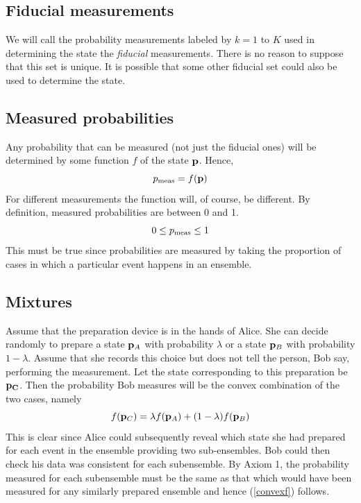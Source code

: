 \documentclass[12pt]{article}
\begin{document}
\subsection{Fiducial measurements}

We will call the probability measurements
labeled by $k=1$ to $K$ used in determining the state the {\it fiducial}
measurements.  There is no reason to suppose that this set is unique.  It
is possible that some other fiducial set could also be used to determine
the state.  

\subsection{Measured probabilities}

Any probability that can be measured (not just the
fiducial ones) will be determined by some function $f$ of
the state ${\bf p}$.  Hence,
\begin{equation}
p_{\rm meas}= f({\bf p})
\end{equation}
For different measurements the function will, of course, be different.
By definition, measured probabilities are between 0 and 1.
\[    0\leq p_{\rm meas} \leq 1 \]
This must be true since probabilities are measured by taking the proportion
of cases in which a particular event happens in an ensemble.

\subsection{Mixtures}


Assume that
the preparation device is in the hands of Alice.  She can decide randomly
to prepare a state ${\bf p}_A$ with probability $\lambda$ or a state
${\bf p}_B$ with probability $1-\lambda$.  Assume that she records this choice
but does not tell the person, Bob say, performing the measurement.
Let the state corresponding to this preparation be ${\bf p_C}$.  Then
the probability Bob measures will be the convex
combination of the two cases, namely
\begin{equation}\label{convexf}
f({\bf p}_C) = \lambda f({\bf p}_A)
+(1-\lambda) f({\bf p}_B)
\end{equation}
This is clear since Alice could subsequently reveal which
state she had prepared for each event in the ensemble providing two
sub-ensembles.  Bob could then check his data was consistent for each
subensemble.  By Axiom 1, the probability measured for each subensemble
must be the same as that which would have been measured for any
similarly prepared ensemble and hence (\ref{convexf}) follows.
\end{document}
